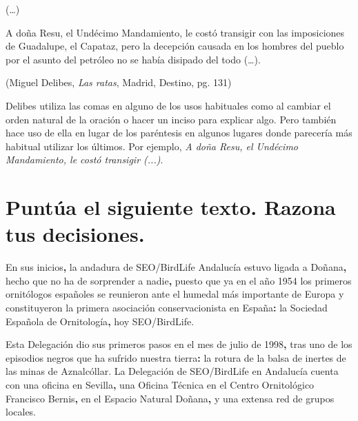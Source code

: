 \documentclass[12pt, a4paper, oneside]{report}
\begin{document}
        (…)

        A doña Resu, el Undécimo Mandamiento, le costó transigir con las imposiciones de Guadalupe, el
        Capataz, pero la decepción causada en los hombres del pueblo por el asunto del petróleo no se había
        disipado del todo (…).
        \begin{flushright}
            (Miguel Delibes, \textit{Las ratas}, Madrid, Destino, pg. 131)
        \end{flushright}

        Delibes utiliza las comas en alguno de los usos habituales como al cambiar el orden natural de la
        oración o hacer un inciso para explicar algo. Pero también hace uso de ella en lugar de los paréntesis
        en algunos lugares donde parecería más habitual utilizar los últimos. Por ejemplo, \textit{A doña
        Resu, el Undécimo Mandamiento, le costó transigir (...)}.

    \section{Puntúa el siguiente texto. Razona tus decisiones.}
        En sus inicios\color{verde}\textbf{,}\color{negro} \;la andadura de SEO/BirdLife Andalucía estuvo
        ligada a Doñana\color{verde}\textbf{,}\color{negro} \;hecho que no ha de sorprender a
        nadie\color{verde}\textbf{,}\color{negro} \;puesto que ya en el año 1954 los primeros ornitólogos
        españoles se reunieron ante el humedal más importante de Europa y constituyeron la primera asociación
        conservacionista en España\color{verde}\textbf{:}\color{negro} \;la Sociedad Española de
        Ornitología\color{verde}\textbf{,}\color{negro} \;hoy SEO/BirdLife.

        Esta Delegación dio sus primeros pasos en el mes de julio de 1998\color{verde}\textbf{,}\color{negro}
        \;tras uno de los episodios negros que ha sufrido nuestra tierra\color{verde}\textbf{:}\color{negro}
        \;la rotura de la balsa de inertes de las minas de Aznalcóllar. La Delegación de SEO/BirdLife en
        Andalucía cuenta con una oficina en Sevilla\color{verde}\textbf{,}\color{negro} \;una Oficina Técnica
        en el Centro Ornitológico Francisco Bernis\color{verde}\textbf{,}\color{negro} \;en el Espacio Natural
        Doñana\color{verde}\textbf{,}\color{negro} \;y una extensa red de grupos locales.
\end{document}
